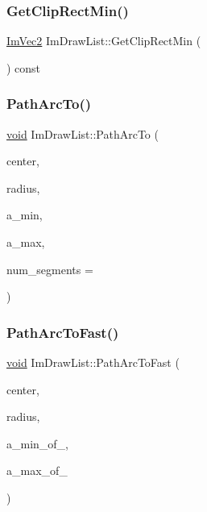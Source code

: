 \mbox{\label{structImDrawList_a9d83896d3eb434a9e1072d56523a2754}} 
\subsubsection{\texorpdfstring{Get\+Clip\+Rect\+Min()}{GetClipRectMin()}}
{\footnotesize\ttfamily \hyperlink{structImVec2}{Im\+Vec2} Im\+Draw\+List\+::\+Get\+Clip\+Rect\+Min (\begin{DoxyParamCaption}{ }\end{DoxyParamCaption}) const\hspace{0.3cm}{\ttfamily [inline]}}

\mbox{\label{structImDrawList_af86073403f1557cccb4ff45dfad0a74a}} 
\subsubsection{\texorpdfstring{Path\+Arc\+To()}{PathArcTo()}}
{\footnotesize\ttfamily \hyperlink{imgui__impl__opengl3__loader_8h_ac668e7cffd9e2e9cfee428b9b2f34fa7}{void} Im\+Draw\+List\+::\+Path\+Arc\+To (\begin{DoxyParamCaption}\item[{const \hyperlink{structImVec2}{Im\+Vec2} \&}]{center,  }\item[{float}]{radius,  }\item[{float}]{a\+\_\+min,  }\item[{float}]{a\+\_\+max,  }\item[{int}]{num\+\_\+segments = {} }\end{DoxyParamCaption})}

\mbox{\label{structImDrawList_a6d307c6de1a6522e76fa410e8fe96fcc}} 
\subsubsection{\texorpdfstring{Path\+Arc\+To\+Fast()}{PathArcToFast()}}
{\footnotesize\ttfamily \hyperlink{imgui__impl__opengl3__loader_8h_ac668e7cffd9e2e9cfee428b9b2f34fa7}{void} Im\+Draw\+List\+::\+Path\+Arc\+To\+Fast (\begin{DoxyParamCaption}\item[{const \hyperlink{structImVec2}{Im\+Vec2} \&}]{center,  }\item[{float}]{radius,  }\item[{int}]{a\+\_\+min\+\_\+of\+\_,  }\item[{int}]{a\+\_\+max\+\_\+of\+\_ }\end{DoxyParamCaption})}


